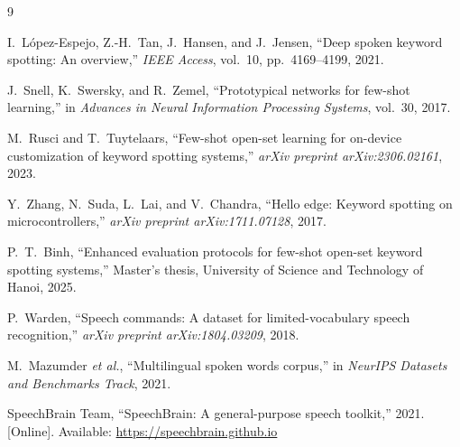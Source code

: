 \documentclass[12pt,a4paper]{report}
\begin{document}
\begin{thebibliography}{9}

I.~L{\'o}pez-Espejo, Z.-H.~Tan, J.~Hansen, and J.~Jensen,
``Deep spoken keyword spotting: An overview,''
\textit{IEEE Access}, vol.~10, pp.~4169--4199, 2021.

J.~Snell, K.~Swersky, and R.~Zemel,
``Prototypical networks for few-shot learning,''
in \textit{Advances in Neural Information Processing Systems}, vol.~30, 2017.

M.~Rusci and T.~Tuytelaars,
``Few-shot open-set learning for on-device customization of keyword spotting
systems,''
\textit{arXiv preprint arXiv:2306.02161}, 2023.

Y.~Zhang, N.~Suda, L.~Lai, and V.~Chandra,
``Hello edge: Keyword spotting on microcontrollers,''
\textit{arXiv preprint arXiv:1711.07128}, 2017.

P.~T.~Binh,
``Enhanced evaluation protocols for few-shot open-set keyword spotting
systems,''
Master's thesis, University of Science and Technology of Hanoi, 2025.

P.~Warden,
``Speech commands: A dataset for limited-vocabulary speech recognition,''
\textit{arXiv preprint arXiv:1804.03209}, 2018.

M.~Mazumder \textit{et al.},
``Multilingual spoken words corpus,''
in \textit{NeurIPS Datasets and Benchmarks Track}, 2021.

SpeechBrain Team,
``SpeechBrain: A general-purpose speech toolkit,''
2021. [Online]. Available: \url{https://speechbrain.github.io}

\end{thebibliography}
\end{document}
